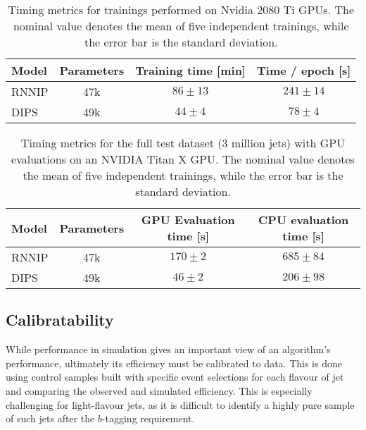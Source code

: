 \begin{table}[htbp!]
  \begin{center}

    \begin{tabular}{l | c | c | c } %
      \textbf{Model} & \textbf{Parameters} & \textbf{Training time [min]} & \textbf{Time / epoch [s]}  \\
      \hline
      RNNIP & 47k & $86 \pm 13$ & $241 \pm 14$  \\
      DIPS    & 49k & $44 \pm 4$ & $78 \pm 4$  \\
    \end{tabular}
    \caption{Timing metrics for trainings performed on Nvidia 2080 Ti GPUs. The nominal value denotes the mean of five independent trainings, while the error bar is the standard deviation.}\label{tab:timingGPUs}
  \end{center}
\end{table}

\begin{table}[htbp!]
  \begin{center}
     \begin{tabular}{l | c | c | c } %
      \textbf{Model} & \textbf{Parameters} & \textbf{GPU Evaluation time [s]} & \textbf{CPU evaluation time [s]}  \\
      \hline
      RNNIP & 47k   & $170 \pm 2$ & $685\pm84$  \\
      DIPS    & 49k & $46 \pm 2$ & $206\pm98$ \\
    \end{tabular}
    \caption{Timing metrics for the full test dataset (3 million jets) with GPU evaluations on an NVIDIA Titan X GPU. The nominal value denotes the mean of five independent trainings, while the error bar is the standard deviation.}\label{tab:timingGPUs_eval}
  \end{center}
\end{table}

\subsection{Calibratability}
\label{subsec:calibratability}

While performance in simulation gives an important view of an algorithm's performance, ultimately its efficiency must be calibrated to data. 
This is done using control samples built with specific event selections for each flavour of jet and comparing the observed and simulated efficiency. 
This is especially challenging for light-flavour jets, as it is difficult to identify a highly pure sample of such jets after the $b$-tagging requirement. 

